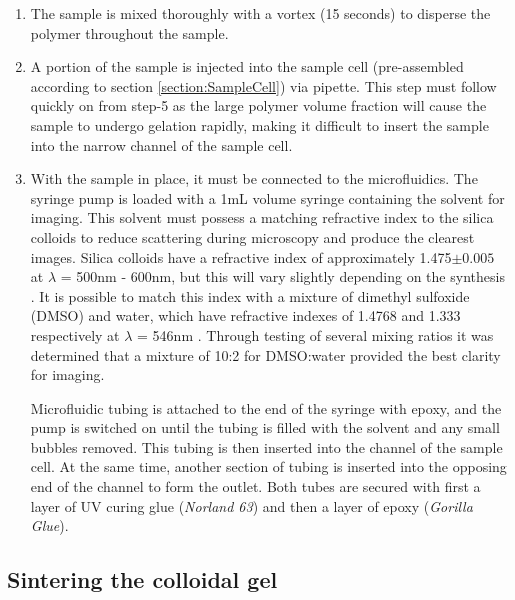 \begin{enumerate}
	\item The sample is mixed thoroughly with a vortex (15 seconds) to disperse the polymer throughout the sample.
	\item A portion of the sample is injected into the sample cell (pre-assembled according to section \ref{section:SampleCell}) via pipette. This step must follow quickly on from step-5 as the large polymer volume fraction will cause the sample to undergo gelation rapidly, making it difficult to insert the sample into the narrow channel of the sample cell.
	\item With the sample in place, it must be connected to the microfluidics. The syringe pump is loaded with a 1mL volume syringe containing the solvent for imaging. This solvent must possess a matching refractive index to the silica colloids to reduce scattering during microscopy and produce the clearest images. Silica colloids have a refractive index of approximately 1.475$\pm 0.005$ at $\lambda$ = 500nm - 600nm, but this will vary slightly depending on the synthesis \cite{khlebtsov2008}. It is possible to match this index with a mixture of dimethyl sulfoxide (DMSO) and water, which have refractive indexes of 1.4768 and 1.333 respectively at $\lambda$ = 546nm \cite{lebel1962}.  
Through testing of several mixing ratios it was determined that a mixture of 10:2 for DMSO:water provided the best clarity for imaging. 

		Microfluidic tubing is attached to the end of the syringe with epoxy, and the pump is switched on until the tubing is filled with the solvent and any small bubbles removed. This tubing is then inserted into the channel of the sample cell. At the same time, another section of tubing is inserted into the opposing end of the channel to form the outlet. Both tubes are secured with first a layer of UV curing glue (\textit{Norland 63}) and then a layer of epoxy (\textit{Gorilla Glue}).	
\end{enumerate}



\subsection{Sintering the colloidal gel}

